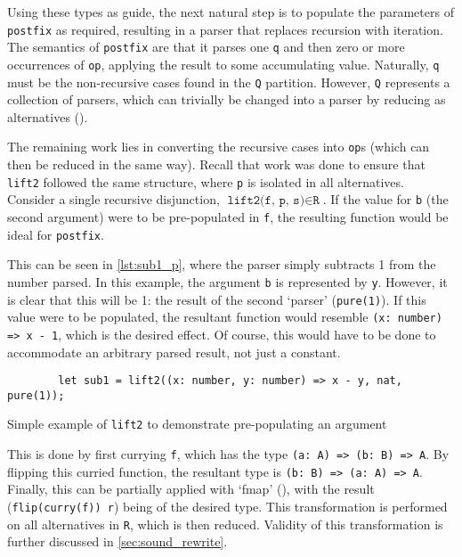 Using these types as guide, the next natural step is to populate the parameters of \texttt{postfix} as required, resulting in a parser that replaces recursion with iteration.
The semantics of \texttt{postfix} are that it parses one \texttt{q} and then zero or more occurrences of \texttt{op}, applying the result to some accumulating value.
Naturally, \texttt{q} must be the non-recursive cases found in the \texttt{Q} partition.
However, \texttt{Q} represents a collection of parsers, which can trivially be changed into a parser by reducing as alternatives (\texttt{\choice}).

The remaining work lies in converting the recursive cases into \texttt{op}s (which can then be reduced in the same way).
Recall that work was done to ensure that \texttt{lift2} followed the same structure, where \texttt{p} is isolated in all alternatives.
Consider a single recursive disjunction, $\texttt{lift2(f, p, s)} \in \texttt{R}$.
If the value for \texttt{b} (the second argument) were to be pre-populated in \texttt{f}, the resulting function would be ideal for \texttt{postfix}.

This can be seen in \autoref{lst:sub1_p}, where the parser simply subtracts 1 from the number parsed.
In this example, the argument \texttt{b} is represented by \texttt{y}.
However, it is clear that this will be 1: the result of the second `parser' (\texttt{pure(1)}).
If this value were to be populated, the resultant function would resemble \texttt{(x: number) => x - 1}, which is the desired effect.
Of course, this would have to be done to accommodate an arbitrary parsed result, not just a constant.

\begin{capminted}
    \begin{verbatim}
        let sub1 = lift2((x: number, y: number) => x - y, nat, pure(1));
    \end{verbatim}
    \vspace{-0.5\baselineskip}
    \caption{Simple example of \texttt{lift2} to demonstrate pre-populating an argument}
    \label{lst:sub1_p}
\end{capminted}

This is done by first currying \texttt{f}, which has the type \texttt{(a: A) => (b: B) => A}.
By flipping this curried function, the resultant type is \texttt{(b: B) => (a: A) => A}.
Finally, this can be partially applied with `fmap' (\texttt{\fmap}), with the result (\texttt{flip(curry(f)) \fmap r}) being of the desired type.
This transformation is performed on all alternatives in \texttt{R}, which is then reduced.
Validity of this transformation is further discussed in \autoref{sec:sound_rewrite}.

